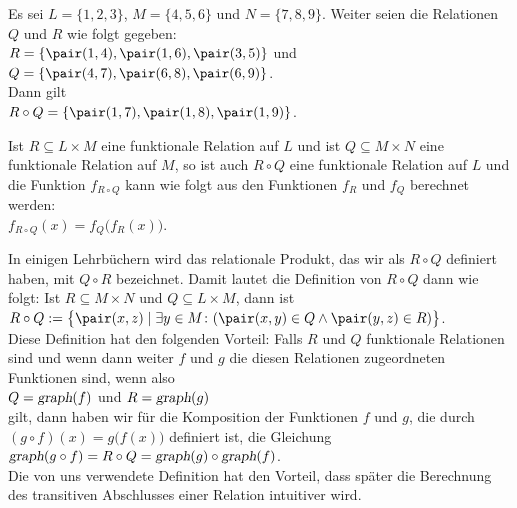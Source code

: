 \example
Es sei $L = \{1,2,3\}$, $M = \{4,5,6\}$ und $N = \{7,8,9\}$.  Weiter seien die Relationen
$Q$ und $R$ wie folgt gegeben: \\[0.2cm]
\hspace*{1.3cm} $R = \{ \pair(1,4), \pair(1,6), \pair(3,5) \}$ \quad und \quad
                $Q = \{ \pair(4,7), \pair(6,8), \pair(6,9) \}$. \\[0.2cm]
Dann gilt \\[0.2cm]
\hspace*{1.3cm} $R \circ Q = \{ \pair(1,7), \pair(1,8), \pair(1,9) \}$.
\eox


\noindent
Ist $R \subseteq L \times M$ eine funktionale Relation auf $L$ und 
ist $Q \subseteq M \times N$ eine funktionale Relation auf $M$, so ist auch 
$R \circ Q$ eine funktionale Relation auf $L$ und die Funktion $f_{R \circ Q}$
kann wie folgt aus den Funktionen $f_R$ und $f_Q$ berechnet werden:
\\[0.2cm]
\hspace*{1.3cm}
$f_{R \circ Q}(x) = f_Q\bigl(f_R(x)\bigr)$.

\remark
In einigen Lehrb\"{u}chern wird das relationale Produkt, 
das wir als $R \circ Q$ definiert haben, mit $Q \circ R$
bezeichnet. Damit lautet die Definition von $R \circ Q$  dann wie folgt:
Ist $R \subseteq M \times N$ und $Q \subseteq L \times M$, dann ist 
\\[0.2cm]
\hspace*{1.3cm}
$R \circ Q := \bigl\{ \pair(x,z) \mid \exists y \in M \colon(\pair(x,y) \in Q \wedge \pair(y,z) \in R) \bigr\}$.
\\[0.2cm]
Diese Definition hat den folgenden Vorteil: Falls $R$ und $Q$ funktionale Relationen sind und wenn
dann weiter $f$ und $g$ die diesen Relationen zugeordneten Funktionen sind, wenn also 
\\[0.2cm]
\hspace*{1.3cm}
$Q = \textsl{graph}(f)$ \quad und \quad $R = \textsl{graph}(g)$
\\[0.2cm]
gilt, dann haben wir f\"{u}r die Komposition der Funktionen $f$ und $g$, die durch $(g \circ
f)(x) = g\bigl(f(x)\bigr)$ 
definiert ist, die Gleichung
\\[0.2cm]
\hspace*{1.3cm}
$\textsl{graph}(g \circ f) = R \circ Q = \textsl{graph}(g) \circ \textsl{graph}(f)$.
\\[0.2cm]
 Die von uns verwendete Definition hat den Vorteil, dass sp\"{a}ter die Berechnung des transitiven
Abschlusses einer Relation intuitiver wird.  \eox



